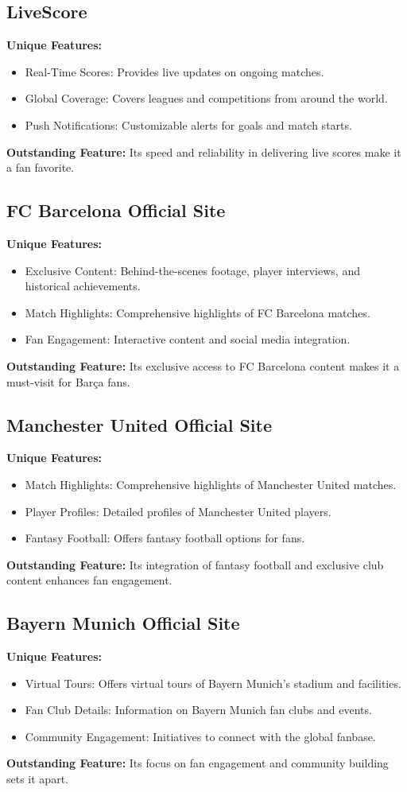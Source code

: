 \subsection{LiveScore}
\textbf{Unique Features:}
\begin{itemize}
    \item Real-Time Scores: Provides live updates on ongoing matches.
    \item Global Coverage: Covers leagues and competitions from around the world.
    \item Push Notifications: Customizable alerts for goals and match starts.
\end{itemize}
\textbf{Outstanding Feature:} Its speed and reliability in delivering live scores make it a fan favorite.

\subsection{FC Barcelona Official Site}
\textbf{Unique Features:}
\begin{itemize}
    \item Exclusive Content: Behind-the-scenes footage, player interviews, and historical achievements.
    \item Match Highlights: Comprehensive highlights of FC Barcelona matches.
    \item Fan Engagement: Interactive content and social media integration.
\end{itemize}
\textbf{Outstanding Feature:} Its exclusive access to FC Barcelona content makes it a must-visit for Barça fans.

\subsection{Manchester United Official Site}
\textbf{Unique Features:}
\begin{itemize}
    \item Match Highlights: Comprehensive highlights of Manchester United matches.
    \item Player Profiles: Detailed profiles of Manchester United players.
    \item Fantasy Football: Offers fantasy football options for fans.
\end{itemize}
\textbf{Outstanding Feature:} Its integration of fantasy football and exclusive club content enhances fan engagement.

\subsection{Bayern Munich Official Site}
\textbf{Unique Features:}
\begin{itemize}
    \item Virtual Tours: Offers virtual tours of Bayern Munich’s stadium and facilities.
    \item Fan Club Details: Information on Bayern Munich fan clubs and events.
    \item Community Engagement: Initiatives to connect with the global fanbase.
\end{itemize}
\textbf{Outstanding Feature:} Its focus on fan engagement and community building sets it apart.

